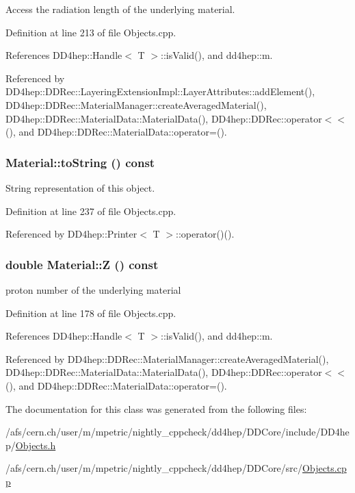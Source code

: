 Access the radiation length of the underlying material. 

Definition at line 213 of file Objects.cpp.

References DD4hep::Handle$<$ T $>$::isValid(), and dd4hep::m.

Referenced by DD4hep::DDRec::LayeringExtensionImpl::LayerAttributes::addElement(), DD4hep::DDRec::MaterialManager::createAveragedMaterial(), DD4hep::DDRec::MaterialData::MaterialData(), DD4hep::DDRec::operator$<$$<$(), and DD4hep::DDRec::MaterialData::operator=().\hypertarget{class_d_d4hep_1_1_geometry_1_1_material_a32830223c2b3fa117acc466e61920cb2}{
\subsubsection[{toString}]{ Material::toString () const}}
\label{class_d_d4hep_1_1_geometry_1_1_material_a32830223c2b3fa117acc466e61920cb2}


String representation of this object. 

Definition at line 237 of file Objects.cpp.

Referenced by DD4hep::Printer$<$ T $>$::operator()().\hypertarget{class_d_d4hep_1_1_geometry_1_1_material_abf2d1a8681be6bd3506956fbc171df1f}{
\subsubsection[{Z}]{\setlength{\rightskip}{0pt plus 5cm}double Material::Z () const}}
\label{class_d_d4hep_1_1_geometry_1_1_material_abf2d1a8681be6bd3506956fbc171df1f}


proton number of the underlying material 

Definition at line 178 of file Objects.cpp.

References DD4hep::Handle$<$ T $>$::isValid(), and dd4hep::m.

Referenced by DD4hep::DDRec::MaterialManager::createAveragedMaterial(), DD4hep::DDRec::MaterialData::MaterialData(), DD4hep::DDRec::operator$<$$<$(), and DD4hep::DDRec::MaterialData::operator=().

The documentation for this class was generated from the following files:\begin{DoxyCompactItemize}
\item 
/afs/cern.ch/user/m/mpetric/nightly\_\-cppcheck/dd4hep/DDCore/include/DD4hep/\hyperlink{_objects_8h}{Objects.h}\item 
/afs/cern.ch/user/m/mpetric/nightly\_\-cppcheck/dd4hep/DDCore/src/\hyperlink{_objects_8cpp}{Objects.cpp}\end{DoxyCompactItemize}
